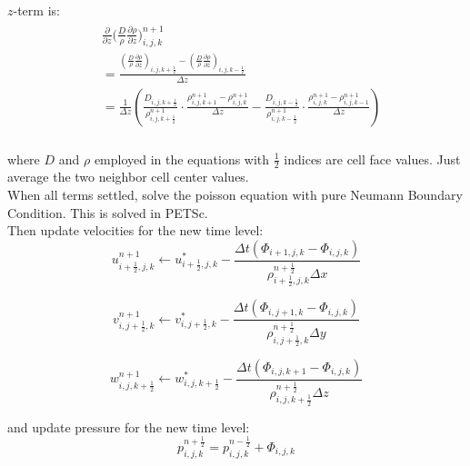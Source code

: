 \documentclass{article}
\numberwithin{equation}{subsection}
\begin{document}
$z$-term is:
\begin{align}
\begin{split}
& \frac{\partial}{\partial z} \Big( \frac{D}{\rho}\frac{\partial \rho}{\partial z} \Big)^{n+1}_{i,j,k} \\
&= \frac{ (\frac{D}{\rho}\frac{\partial \rho}{\partial z})_{i,j,k+\frac{1}{2}} - (\frac{D}{\rho}\frac{\partial \rho}{\partial z})_{i,j,k-\frac{1}{2}} }{\Delta z} \\
& = \frac{1}{\Delta z}(\frac{D_{i,j,k+\frac{1}{2}}}{\rho^{n+1}_{i,j,k+\frac{1}{2}}}\cdot \frac{\rho^{n+1}_{i,j,k+1} - \rho^{n+1}_{i,j,k}}{\Delta z} 
- \frac{D_{i,j,k-\frac{1}{2}}}{\rho^{n+1}_{i,j,k-\frac{1}{2}}}\cdot \frac{\rho^{n+1}_{i,j,k} - \rho^{n+1}_{i,j,k-1}}{\Delta z})  \\
\end{split}
\end{align}

where $D$ and $\rho$ employed in the equations with $\frac{1}{2}$ indices are cell face values. Just average the two neighbor cell center values.\\
When all terms settled, solve the poisson equation with pure Neumann Boundary Condition. This is solved in PETSc.\\
Then update velocities for the new time level:
\begin{equation}
u^{n+1}_{i+\frac{1}{2},j,k} \leftarrow u^{*}_{i+\frac{1}{2},j,k} - \frac{\Delta t (\Phi_{i+1,j,k} - \Phi_{i,j,k})}{\rho^{n+\frac{1}{2}}_{i+\frac{1}{2},j,k} \Delta x}
\end{equation}


\begin{equation}
v^{n+1}_{i,j+\frac{1}{2},k} \leftarrow v^{*}_{i,j+\frac{1}{2},k} - \frac{\Delta t (\Phi_{i,j+1,k} - \Phi_{i,j,k})}{\rho^{n+\frac{1}{2}}_{i,j+\frac{1}{2},k} \Delta y}
\end{equation}


\begin{equation}
w^{n+1}_{i,j,k+\frac{1}{2}} \leftarrow w^{*}_{i,j,k+\frac{1}{2}} - \frac{\Delta t (\Phi_{i,j,k+1} - \Phi_{i,j,k})}{\rho^{n+\frac{1}{2}}_{i,j,k+\frac{1}{2}} \Delta z}
\end{equation}

and update pressure for the new time level:
\begin{equation}
p^{n+\frac{1}{2}}_{i,j,k} = p^{n-\frac{1}{2}}_{i,j,k} + \Phi_{i,j,k}
\end{equation}




\end{document}
